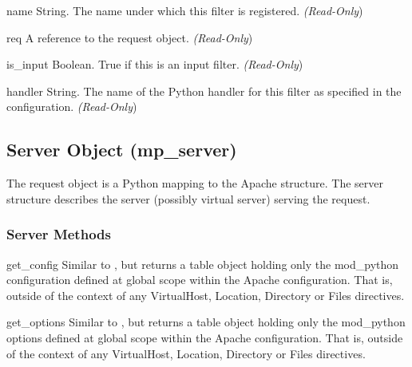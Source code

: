 \begin{memberdesc}[filter]{name}
  String. The name under which this filter is registered.
  \emph{(Read-Only})
\end{memberdesc}

\begin{memberdesc}[filter]{req}
  A reference to the request object.
  \emph{(Read-Only})
\end{memberdesc}

\begin{memberdesc}[filter]{is_input}
  Boolean. True if this is an input filter.
  \emph{(Read-Only})
\end{memberdesc}

\begin{memberdesc}[filter]{handler}
  String. The name of the Python handler for this filter as specified in
  the configuration. 
  \emph{(Read-Only})
\end{memberdesc}

\subsection{Server Object (mp_server)\label{pyapi-mpserver}}

The request object is a Python mapping to the Apache 
structure. The server structure describes the server (possibly virtual
server) serving the request.

\subsubsection{Server Methods\label{pyapi-mpsrv-meth}}

\begin{methoddesc}[server]{get_config}{}
  Similar to , but returns a table object holding
  only the mod_python configuration defined at global scope within the
  Apache configuration. That is, outside of the context of any VirtualHost,
  Location, Directory or Files directives.
\end{methoddesc}

\begin{methoddesc}[server]{get_options}{}
  Similar to , but returns a table object holding
  only the mod_python options defined at global scope within the Apache
  configuration. That is, outside of the context of any VirtualHost, Location,
  Directory or Files directives.
\end{methoddesc}

